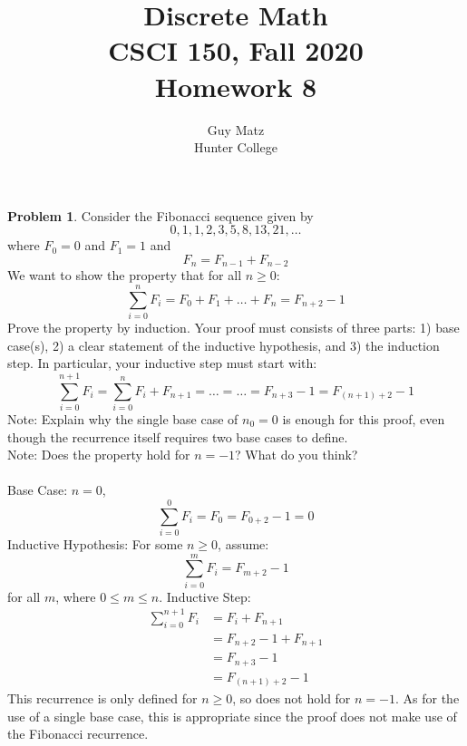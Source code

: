 \documentclass[10pt,leqno ]{article}
\title{Discrete Math\\
CSCI 150, Fall 2020\\
Homework 8}
\author{Guy Matz \\
Hunter College}
\theoremstyle{definition}
\newtheorem{problem}[theorem]{Problem}
\begin{document}
\begin{problem} Consider the Fibonacci sequence given by
$$0,1,1,2,3,5,8,13,21, \dots $$
where $F_0 = 0$ and $F_1= 1$ and
$$F_n = F_{n-1} + F_{n-2}$$
We want to show the property that for all $n \geq 0$:\\
$$\sum_{i=0}^{n} F_i = F_0 + F_1 + \dots + F_n = F_{n+2}-1$$
Prove  the  property  by  induction.   Your  proof  must  consists  of  three  parts:  1)  base case(s),  2)  a  clear  statement  of  the  inductive hypothesis,  and  3)  the induction step.  In particular, your inductive step must start with:
$$ \sum_{i=0}^{n+1} F_i = \sum_{i=0}^{n} F_i + F_{n+1} = \dots = \dots = F_{n+3} - 1 = F_{(n+1)+2}-1 $$
Note: Explain why the single base case of $n_0 = 0$ is enough for this proof, even though the recurrence itself requires two base cases to define.\\
Note:  Does the property hold for $n=-1$?  What do you think?
\\\\
\Large
Base Case: $n = 0$,
$$\sum_{i=0}^{0} F_i = F_0 = F_{0+2} -1 = 0$$
Inductive Hypothesis:  For some $n \geq 0$, assume:
$$\sum_{i=0}^{m} F_i = F_{m+2}-1$$
for all $m$, where $0 \leq m \leq n$.
Inductive Step:
\begin{align*}
\sum_{i=0}^{n+1} F_i &= F_{i} + F_{n+1}\\
                      &= F_{n+2} - 1 + F_{n+1}\\
                      &= F_{n+3} - 1 \\
                      &= F_{(n+1) + 2} - 1
\end{align*}
This recurrence is only defined for $n \geq 0$, so does not hold for $n = -1$.  As for the use of a single base case, this is appropriate since the proof does not make use of the Fibonacci recurrence.
\end{problem}
\newpage
\end{document}
